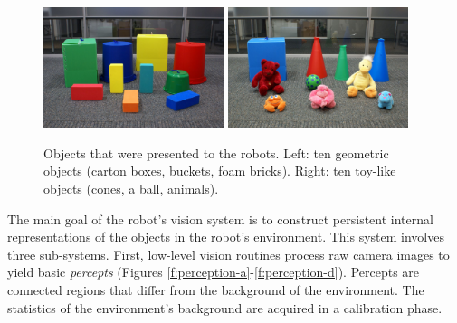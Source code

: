 \begin{figure}[htbp]
  \includegraphics[width=0.47\textwidth]{./experiments/figures/grounding-data-sets-geometric-objects}
  \hspace{0.04\columnwidth}
  \includegraphics[width=0.47\textwidth]{./experiments/figures/grounding-data-sets-toy-objects}
  \caption[Objects that were represented to the robots]{Objects that
    were presented to the robots. Left: ten geometric objects (carton
    boxes, buckets, foam bricks). Right: ten toy-like objects (cones,
    a ball, animals).}
  \label{f:object-sets}
\end{figure}

The main goal of the robot's vision system is to construct persistent
internal representations of the objects in the robot's
environment. This system involves three sub-systems. First,
low-level vision routines process raw camera images to yield basic
\emph{percepts} (Figures
\ref{f:perception-a}-\ref{f:perception-d}). Percepts are connected
regions that differ from the background of the environment. The
statistics of the environment's background are acquired in a
calibration phase.

